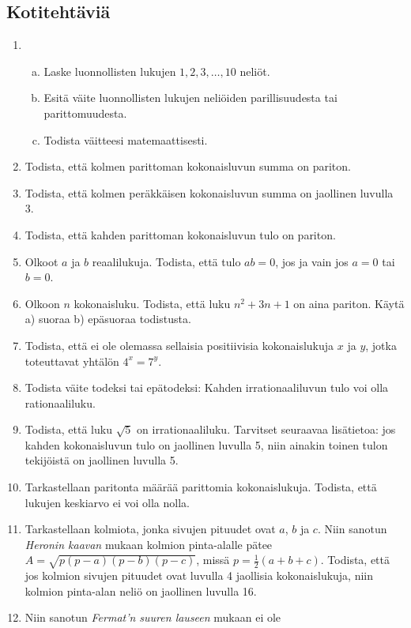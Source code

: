 \subsection*{Kotitehtäviä}

\begin{enumerate}
	\item \begin{enumerate}[a)]
		\item Laske luonnollisten lukujen $1, 2, 3,\ldots, 10$ neliöt.
		\item Esitä väite luonnollisten lukujen neliöiden parillisuudesta tai parittomuudesta.
		\item Todista väitteesi matemaattisesti.
		\end{enumerate}
	\item Todista, että kolmen parittoman kokonaisluvun summa on pariton.
	\item Todista, että kolmen peräkkäisen kokonaisluvun summa on jaollinen luvulla 3.
	\item Todista, että kahden parittoman kokonaisluvun tulo on pariton.
	\item Olkoot $a$ ja $b$ reaalilukuja. Todista, että tulo $ab = 0$, jos ja vain jos $a=0$ tai $b=0$.
	\item Olkoon $n$ kokonaisluku. Todista, että luku $n^{2} + 3n + 1$ on aina pariton. Käytä a) suoraa b) epäsuoraa
		todistusta.
	\item Todista, että ei ole olemassa sellaisia positiivisia kokonaislukuja $x$ ja $y$, jotka toteuttavat
		yhtälön $4^{x} = 7^{y}$.
	\item Todista väite todeksi tai epätodeksi: Kahden
		irrationaaliluvun tulo voi olla rationaaliluku.
	\item Todista, että luku $\sqrt{5}$ on irrationaaliluku.
		Tarvitset seuraavaa lisätietoa: jos kahden kokonaisluvun
		tulo on jaollinen luvulla 5, niin ainakin toinen tulon
		tekijöistä on jaollinen luvulla 5.
	\item Tarkastellaan paritonta määrää parittomia kokonaislukuja.
		Todista, että lukujen keskiarvo ei voi olla nolla.
	\item Tarkastellaan kolmiota, jonka sivujen pituudet ovat
		$a$, $b$ ja $c$. Niin sanotun \emph{Heronin kaavan} mukaan
		kolmion pinta-alalle pätee $A = \sqrt{p(p-a)(p-b)(p-c)}$,
		missä $p = \frac{1}{2}(a+b+c)$. Todista, että jos kolmion
		sivujen pituudet ovat luvulla 4 jaollisia kokonaislukuja,
		niin kolmion pinta-alan neliö on jaollinen luvulla 16.
	\item Niin sanotun \emph{Fermat'n suuren lauseen} mukaan ei ole

\end{enumerate}
